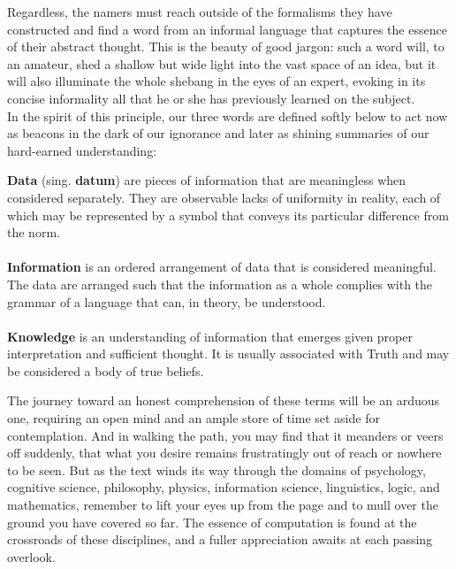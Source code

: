 Regardless, the namers must reach outside of the formalisms they have constructed and find a word from an informal language that captures the essence of their abstract thought. This is the beauty of good jargon: such a word will, to an amateur, shed a shallow but wide light into the vast space of an idea, but it will also illuminate the whole shebang in the eyes of an expert, evoking in its concise informality all that he or she has previously learned on the subject. \\

In the spirit of this principle, our three words are defined softly below to act now as beacons in the dark of our ignorance and later as shining summaries of our hard-earned understanding: \\

\begin{displayquote}
	\textbf{Data} (sing. \textbf{datum}) are pieces of information that are meaningless when considered separately. They are observable lacks of uniformity in reality, each of which may be represented by a symbol that conveys its particular difference from the norm. \\~\\
	\textbf{Information} is an ordered arrangement of data that is considered meaningful. The data are arranged such that the information as a whole complies with the grammar of a language that can, in theory, be understood. \\~\\
	\textbf{Knowledge} is an understanding of information that emerges given proper interpretation and sufficient thought. It is usually associated with Truth and may be considered a body of true beliefs. \\
\end{displayquote}

The journey toward an honest comprehension of these terms will be an arduous one, requiring an open mind and an ample store of time set aside for contemplation. And in walking the path, you may find that it meanders or veers off suddenly, that what you desire remains frustratingly out of reach or nowhere to be seen. But as the text winds its way through the domains of psychology, cognitive science, philosophy, physics, information science, linguistics, logic, and mathematics, remember to lift your eyes up from the page and to mull over the ground you have covered so far. The essence of computation is found at the crossroads of these disciplines, and a fuller appreciation awaits at each passing overlook. \\

